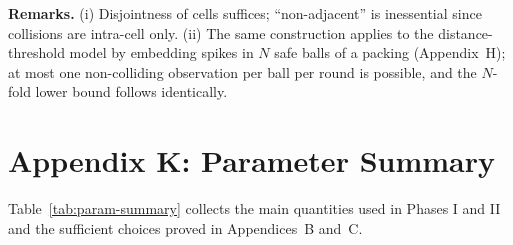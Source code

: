 \medskip

\noindent\textbf{Remarks.}
(i) Disjointness of cells suffices; ``non-adjacent” is inessential since collisions are intra-cell only.  
(ii) The same construction applies to the distance-threshold model by embedding spikes in $N$ safe balls of a packing (Appendix~H); at most one non-colliding observation per ball per round is possible, and the $N$-fold lower bound follows identically.










\section*{Appendix K: Parameter Summary}
\label{app:param-summary}

Table~\ref{tab:param-summary} collects the main quantities used in Phases I and II and the sufficient choices proved in Appendices~B and~C.

